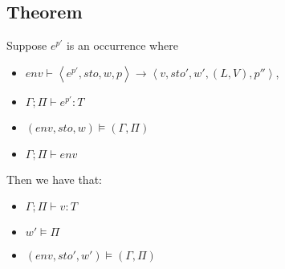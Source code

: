 \documentclass[../../master.tex]{subfiles}
\begin{document}
\subsection{Theorem}
\begin{theorem}
	Suppose $e^{p'}$ is an occurrence where
	\begin{itemize}
		\item $env\vdash\left\langle e^{p'},sto,w,p\right\rangle\rightarrow\left\langle v,sto',w',(L,V),p''\right\rangle$,
		\item $\Gamma;\Pi\vdash e^{p'} : T$
		\item $(env,sto,w)\models(\Gamma,\Pi)$
		\item $\Gamma;\Pi\vdash env$
	\end{itemize}
	Then we have that:
	\begin{itemize}
		\item $\Gamma;\Pi\vdash v:T$
		\item $w'\models\Pi$
		\item $(env,sto',w')\models(\Gamma,\Pi)$
	\end{itemize}
\end{theorem}
\end{document}
